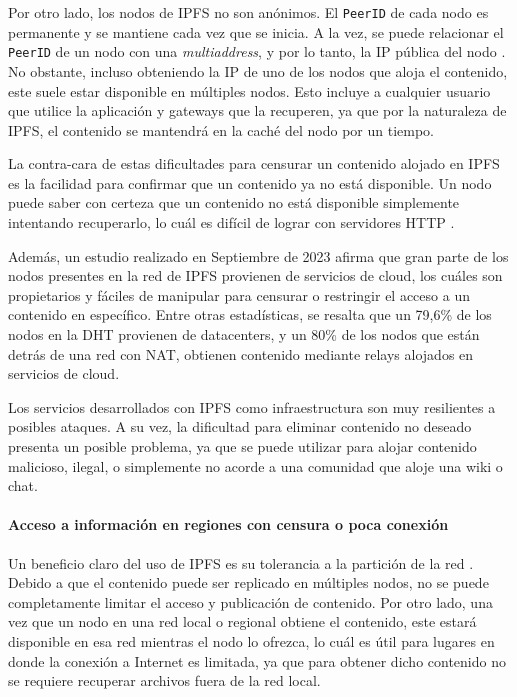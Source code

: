 Por otro lado, los nodos de IPFS no son anónimos. El \texttt{PeerID} de cada nodo es permanente y se mantiene cada vez que se inicia. A la vez, se puede relacionar el \texttt{PeerID} de un nodo con una \textit{multiaddress}, y por lo tanto, la IP pública del nodo \cite{privacy-ipfs}. No obstante, incluso obteniendo la IP de uno de los nodos que aloja el contenido, este suele estar disponible en múltiples nodos. Esto incluye a cualquier usuario que utilice la aplicación y gateways que la recuperen, ya que por la naturaleza de IPFS, el contenido se mantendrá en la caché del nodo por un tiempo.

La contra-cara de estas dificultades para censurar un contenido alojado en IPFS es la facilidad para confirmar que un contenido ya no está disponible. Un nodo puede saber con certeza que un contenido no está disponible simplemente intentando recuperarlo, lo cuál es difícil de lograr con servidores HTTP \cite{doan2022decentralisedcloudstorageipfs}.

Además, un estudio realizado en Septiembre de 2023 \cite{Balduf_2023} afirma que gran parte de los nodos presentes en la red de IPFS provienen de servicios de cloud, los cuáles son propietarios y fáciles de manipular para censurar o restringir el acceso a un contenido en específico. Entre otras estadísticas, se resalta que un 79,6\% de los nodos en la DHT provienen de datacenters, y un 80\% de los nodos que están detrás de una red con NAT, obtienen contenido mediante relays alojados en servicios de cloud. 

Los servicios desarrollados con IPFS como infraestructura son muy resilientes a posibles ataques. A su vez, la dificultad para eliminar contenido no deseado presenta un posible problema, ya que se puede utilizar para alojar contenido malicioso, ilegal, o simplemente no acorde a una comunidad que aloje una wiki o chat.

\paragraph{Acceso a información en regiones con censura o poca conexión} Un beneficio claro del uso de IPFS es su tolerancia a la partición de la red \cite{doan2022decentralisedcloudstorageipfs}. Debido a que el contenido puede ser replicado en múltiples nodos, no se puede completamente limitar el acceso y publicación de contenido. Por otro lado, una vez que un nodo en una red local o regional obtiene el contenido, este estará disponible en esa red mientras el nodo lo ofrezca, lo cuál es útil para lugares en donde la conexión a Internet es limitada, ya que para obtener dicho contenido no se requiere recuperar archivos fuera de la red local.

